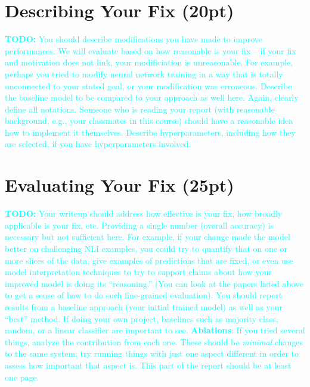 \documentclass[twocolumn]{article}
\newcommand{\todo}[1]{\textcolor{cyan}{\textbf{TODO:} #1}}
\begin{document}
\section{Describing Your Fix (20pt)}



\todo{You should describe modifications you have made to improve performances. We will evaluate based on how reasonable is your fix  -- if your fix and motivation does not link, your modificiation is unreasonable. For example, perhaps you tried to modify neural network training in a way that is totally unconnected to your stated goal, or your modification was erroneous. Describe the baseline model to be compared to your approach as well here. Again, clearly define all notations. Someone who is reading your report (with reasonable background, e.g., your classmates in this course) should have a reasonable idea how to implement it themselves. Describe hyperparameters, including how they are selected, if you have hyperparameters involved. 
}

\section{Evaluating Your Fix (25pt)}
\todo{
Your writeup should address how effective is your fix, how broadly applicable is your fix, etc. Providing a single number (overall accuracy) is necessary but not sufficient here. For example, if your change made the model better on challenging NLI examples, you could try to quantify that on one or more slices of the data, give examples of predictions that are fixed, or even use model interpretation techniques to try to support claims about how your improved model is doing its ``reasoning.'' (You can look at the papers listed above to get a sense of how to do such fine-grained evaluation).  You should report results from a baseline approach (your initial trained model) as well as your ``best'' method. If doing your own project, baselines such as majority class, random, or a linear classifier are important to see. \textbf{Ablations}: If you tried several things, analyze the contribution from each one. These should be \emph{minimal} changes to the same system; try running things with just one aspect different in order to assess how important that aspect is. This part of the report should be at least one page.}


\end{document}
